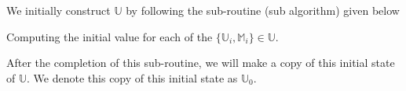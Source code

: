 \documentclass[../ClusteringConnectionsMAIN.tex]{subfiles}
\begin{document}
\begin{flushleft}
\begin{large}


We initially construct $\mathbb{U}$ by following the sub-routine (sub algorithm) given below

\begin{algorithm}
\caption{Computing the initial value for each of the $\bigl\{ \mathbb{U}_i, \mathbb{M}_i \bigr\} \in \mathbb{U}$.}
\end{algorithm}

After the completion of this sub-routine, we will make a copy of this initial state of $\mathbb{U}$.  We denote this copy of this initial state as $\mathbb{U}_0$.








































\end{large}
\end{flushleft}
\end{document}
